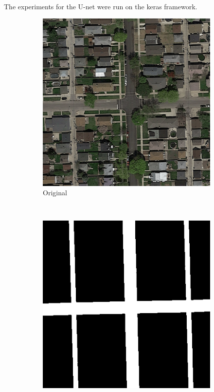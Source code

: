 \documentclass[10pt,conference,compsocconf]{IEEEtran}
\begin{document}
 The experiments for the U-net were run on the keras\cite{chollet2015keras} framework.
 \begin{figure}[!h]
 	\centering
 	\begin{subfigure}[b]{0.12\textwidth}
 		\includegraphics[width=\textwidth]{original.png}
 		\caption{Original}
 	\end{subfigure}
 	~ %
 	\begin{subfigure}[b]{0.12\textwidth}
 		\includegraphics[width=\textwidth]{truth.png}

\end{subfigure}
\end{figure}
\end{document}
